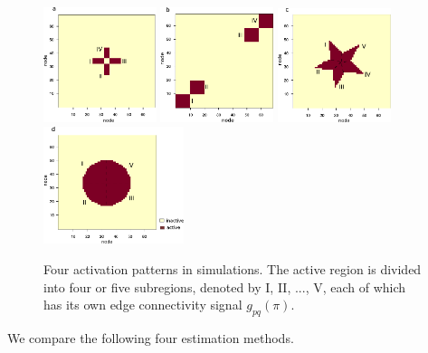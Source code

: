 \documentclass[aos]{imsart}
\theoremstyle{definition}
\begin{document}
\begin{figure}[b!]
\centering
\includegraphics[width=3.3cm]{figure/cross.pdf}
\includegraphics[width=3.3cm]{figure/block.pdf}
\includegraphics[width=3.3cm]{figure/star.pdf}
\includegraphics[width=4.1cm]{figure/circle.pdf}
\caption{Four activation patterns in simulations. The active region is divided into four or five subregions, denoted by I, II, ..., V, each of which has its own edge connectivity signal $g_{pq}(\pi)$.}
\label{fig:region}
\end{figure}

We compare the following four estimation methods. 
\end{document}

